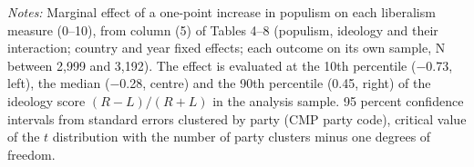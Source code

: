 \par\smallskip\begin{minipage}{\linewidth}\scriptsize\textit{Notes:} Marginal effect of a one-point increase in populism on each liberalism measure (0--10), from column (5) of Tables 4--8 (populism, ideology and their interaction; country and year fixed effects; each outcome on its own sample, N between 2,999 and 3,192). The effect is evaluated at the 10th percentile ($-$0.73, left), the median ($-$0.28, centre) and the 90th percentile (0.45, right) of the ideology score $(R-L)/(R+L)$ in the analysis sample. 95 percent confidence intervals from standard errors clustered by party (CMP party code), critical value of the $t$ distribution with the number of party clusters minus one degrees of freedom.\end{minipage}
